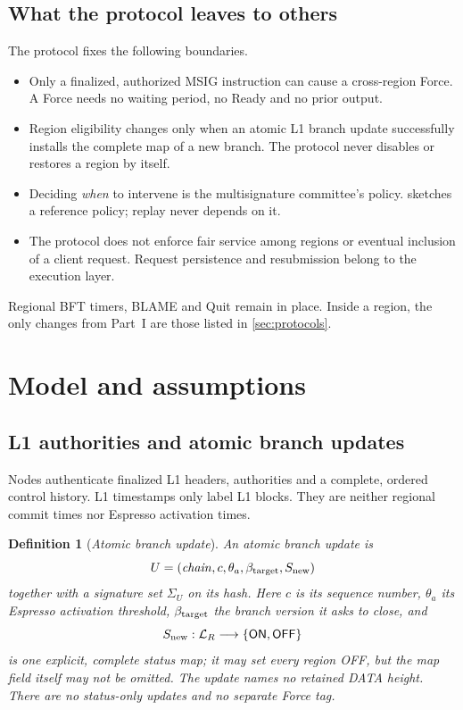 \documentclass[11pt,a4paper]{article}
\newcommand{\tagg}[1]{\ensuremath{\mathsf{#1}}}
\newcommand{\defterm}[1]{\textcolor{rrBlue}{\textit{#1}}}
\newtheorem{definition}{Definition}[section]
\newcounter{protocol}
\begin{document}
\subsection{What the protocol leaves to others}
\label{sec:scope}
The protocol fixes the following boundaries.
\begin{itemize}
\item Only a finalized, authorized MSIG instruction can cause a
cross-region Force. A Force needs no waiting period, no Ready and no
prior output.
\item Region eligibility changes only when an atomic L1 branch update
successfully installs the complete map of a new branch. The protocol
never disables or restores a region by itself.
\item Deciding \emph{when} to intervene is the multisignature
committee's policy.  sketches a reference policy;
replay never depends on it.
\item The protocol does not enforce fair service among regions or
eventual inclusion of a client request. Request persistence and
resubmission belong to the execution layer.
\end{itemize}
Regional BFT timers, BLAME and Quit remain in place. Inside a region,
the only changes from Part~I are those listed in \cref{sec:protocols}.

\section{Model and assumptions}
\label{sec:model}
\subsection{L1 authorities and atomic branch updates}
\label{sec:l1}
\label{sec:runtime-controls}
Nodes authenticate finalized L1 headers, authorities and a complete,
ordered control history. L1 timestamps only label L1 blocks. They are
neither regional commit times nor Espresso activation times.

\begin{definition}[\defterm{Atomic branch update}]
\label{def:control-update}
An atomic branch update is
\[
 U=(\mathit{chain},c,\theta_a,\beta_{\rm target},S_{\rm new})
\]
together with a signature set $\Sigma_U$ on its hash. Here $c$ is its
sequence number, $\theta_a$ its Espresso activation threshold,
$\beta_{\rm target}$ the branch version it asks to close, and
\[
 S_{\rm new}:\mathcal L_R\longrightarrow
 \{\tagg{ON},\tagg{OFF}\}
\]
is one explicit, complete status map; it may set every region OFF, but
the map field itself may not be omitted. The update names no retained
DATA height. There are no status-only updates and no separate Force tag.
\end{definition}
\end{document}
